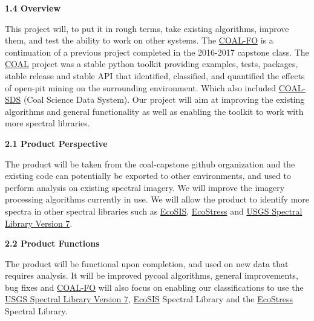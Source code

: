 \documentclass[a4paper,12pt]{article}
\begin{document}
\noindent \textbf{1.4 Overview}\newline


\noindent This project will, to put it in rough terms, take existing algorithms, improve them, and test the ability to work on other systems. The \href{https://capstone-coal.github.io/team}{COAL-FO} is a continuation of a previous project completed in the 2016-2017 capstone class. The \href{https://capstone-coal.github.io/}{COAL} project was a stable python toolkit providing examples, tests, packages, stable release and stable API that identified, classified, and quantified the effects of open-pit mining on the surrounding environment. Which also included \href{https://github.com/capstone-coal/coal-sds}{COAL-SDS} (Coal Science Data System). Our project will aim at improving the existing algorithms and general functionality as well as enabling the toolkit to work with more spectral libraries. \newline


\newline


\noindent \textbf{2.1 Product Perspective}\newline


\noindent The product will be taken from the coal-capstone github organization and the existing code can potentially be exported to other environments, and used to perform analysis on existing spectral imagery. We will improve the imagery processing algorithms currently in use. We will allow the product to identify more spectra in other spectral libraries such as \href{https://ecosis.org/}{EcoSIS}, \href{https://speclib.jpl.nasa.gov/}{EcoStress} and \href{https://speclab.cr.usgs.gov/spectral-lib.html}{USGS Spectral Library Version 7}.\newline


\noindent \textbf{2.2 Product Functions}\newline


\noindent The product will be functional upon completion, and used on new data that requires analysis. It will be improved pycoal algorithms, general improvements, bug fixes and  \href{https://capstone-coal.github.io/team}{COAL-FO} will also focus on enabling our classifications to use the \href{https://speclab.cr.usgs.gov/spectral-lib.html}{USGS Spectral Library Version 7}, \href{https://ecosis.org/}{EcoSIS} Spectral Library and the \href{https://speclib.jpl.nasa.gov/}{EcoStress} Spectral Library.  \newline
\end{document}
